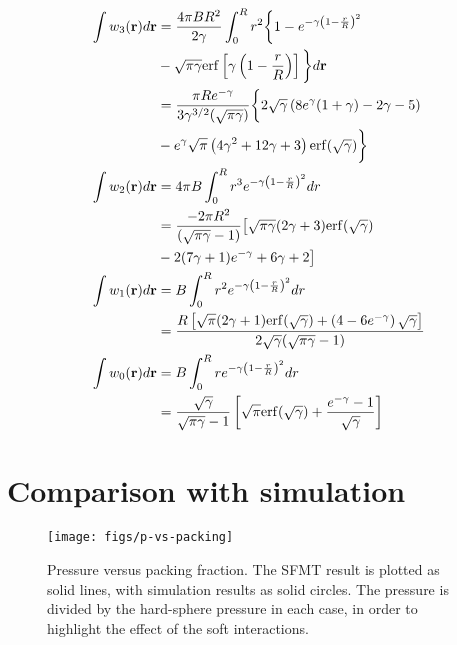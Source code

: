 \documentclass[letterpaper,twocolumn,amsmath,amssymb,prb]{revtex4-1}
\newcommand{\rr}{\textbf{r}}
\begin{document}
\begin{align}
  \int w_3(\rr)d\rr &= \frac{4\pi BR^2}{2\gamma}\int_0^R r^2 \bigg\{1-
                     e^{-\gamma \left(1-\frac{r}{R} \right)^2} \notag\\
                    &-\sqrt{\pi \gamma} \mathrm{erf}\left[ \gamma \left(1 - \frac{r}{R}
                      \right) \right] \bigg\} d\rr\\
                     &= \frac{\pi R
                       e^{-\gamma}}{3\gamma^{3/2}(\sqrt{\pi \gamma})}
                     \bigg\{2\sqrt{\gamma}
                     \left(8e^\gamma(1+\gamma)-2\gamma -5 \right) \notag\\
                     &- e^\gamma \sqrt{\pi} \left(4\gamma^2 +12\gamma
                     +3 \right) \mathrm{erf}(\sqrt{\gamma}) \bigg\}\\
  \int w_2(\rr)d\rr &= 4\pi B \int_0^R r^3 e^{-\gamma \left ( 1 - \frac{r}{R}
           \right)^2} dr \\
        &= \frac{-2\pi R^2}{(\sqrt{\pi
           \gamma} -1)}\big[ \sqrt{\pi \gamma}(2\gamma
           +3)\mathrm{erf}(\sqrt{\gamma})\notag \\
           & - 2(7\gamma + 1)e^{-\gamma} +6\gamma +2 \big] \\
  \int w_1(\rr)d\rr &= B\int_0^R r^2 e^{-\gamma \left ( 1 - \frac{r}{R}
            \right)^2} dr\\
         &= \frac{R\left[ \sqrt{\pi}(2\gamma + 1)\mathrm{erf}(\sqrt{\gamma})
          + \left(4-6e^{-\gamma}\right)\sqrt{\gamma}
          \right]}{2\sqrt{\gamma}( \sqrt{\pi \gamma} -1)} \\
  \int w_0(\rr)d\rr &= B\int_0^R r e^{-\gamma \left ( 1 - \frac{r}{R}
            \right)^2} dr\\
              &= \frac{\sqrt{\gamma}}{\sqrt{\pi \gamma} -1}\left[
              \sqrt{\pi} \mathrm{erf}(\sqrt{\gamma}) +
               \frac{e^{-\gamma}-1}{\sqrt{\gamma}} \right]
\end{align}
 
\section{Comparison with simulation}

\begin{figure}
\begin{center}
\texttt{[image: figs/p-vs-packing]}
\end{center}
\caption{Pressure versus packing fraction.  The SFMT result is plotted
  as solid lines, with simulation results as solid circles.  The
  pressure is divided by the hard-sphere pressure in each case, in
  order to highlight the effect of the soft interactions.}
\label{fig:p-vs-packing}
\end{figure}
\end{document}
